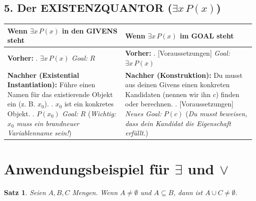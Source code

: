 \documentclass{article}
\newtheorem{theorem}{Satz}
\begin{document}
\subsection*{5. Der EXISTENZQUANTOR ($\exists x \, P(x)$)}
\begin{center}
\small
\begin{tabular}{ L{0.45\textwidth} | L{0.45\textwidth} }
\toprule
\textbf{Wenn $\exists x \, P(x)$ in den GIVENS steht} & \textbf{Wenn $\exists x \, P(x)$ im GOAL steht} \\
\midrule
\textbf{Vorher:} . $\exists x \, P(x)$ \newline
\emph{Goal:} $R$ &
\textbf{Vorher:} . [Voraussetzungen] \newline
\emph{Goal:} $\exists x \, P(x)$ \\
\hline
\textbf{Nachher (Existential Instantiation):} \newline
Führe einen Namen für das existierende Objekt ein (z. B. $x_0$). . $x_0$ ist ein konkretes Objekt. . $P(x_0)$ \newline
\emph{Goal:} $R$ \newline
(\emph{Wichtig: $x_0$ muss ein brandneuer Variablenname sein!}) &
\textbf{Nachher (Konstruktion):} \newline
Du musst aus deinen Givens einen konkreten Kandidaten (nennen wir ihn $c$) finden oder berechnen. . [Voraussetzungen] \newline
\emph{Neues Goal:} $P(c)$ \newline
(\emph{Du musst beweisen, dass dein Kandidat die Eigenschaft erfüllt.}) \\
\bottomrule
\end{tabular}
\end{center}

\newpage

\section*{Anwendungsbeispiel für $\exists$ und $\lor$}

\begin{theorem}
Seien $A, B, C$ Mengen. Wenn $A \neq \emptyset$ und $A \subseteq B$, dann ist $A \cup C \neq \emptyset$.
\end{theorem}
\end{document}
